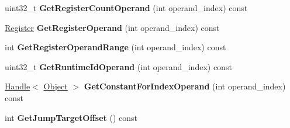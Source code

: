 \begin{DoxyCompactItemize}
\item 
uint32\+\_\+t {\bfseries Get\+Register\+Count\+Operand} (int operand\+\_\+index) const \hypertarget{classv8_1_1internal_1_1interpreter_1_1_bytecode_array_iterator_af5097fc3511c97d6c74ff95febcae001}{}\label{classv8_1_1internal_1_1interpreter_1_1_bytecode_array_iterator_af5097fc3511c97d6c74ff95febcae001}

\item 
\hyperlink{classv8_1_1internal_1_1interpreter_1_1_register}{Register} {\bfseries Get\+Register\+Operand} (int operand\+\_\+index) const \hypertarget{classv8_1_1internal_1_1interpreter_1_1_bytecode_array_iterator_a0deec7570ea13660eac5ed386a8e4236}{}\label{classv8_1_1internal_1_1interpreter_1_1_bytecode_array_iterator_a0deec7570ea13660eac5ed386a8e4236}

\item 
int {\bfseries Get\+Register\+Operand\+Range} (int operand\+\_\+index) const \hypertarget{classv8_1_1internal_1_1interpreter_1_1_bytecode_array_iterator_aa461d65c093c1c438a27b7e59070a0e7}{}\label{classv8_1_1internal_1_1interpreter_1_1_bytecode_array_iterator_aa461d65c093c1c438a27b7e59070a0e7}

\item 
uint32\+\_\+t {\bfseries Get\+Runtime\+Id\+Operand} (int operand\+\_\+index) const \hypertarget{classv8_1_1internal_1_1interpreter_1_1_bytecode_array_iterator_ae3b132e6504ef762511320ecbd2f9ccd}{}\label{classv8_1_1internal_1_1interpreter_1_1_bytecode_array_iterator_ae3b132e6504ef762511320ecbd2f9ccd}

\item 
\hyperlink{classv8_1_1internal_1_1_handle}{Handle}$<$ \hyperlink{classv8_1_1internal_1_1_object}{Object} $>$ {\bfseries Get\+Constant\+For\+Index\+Operand} (int operand\+\_\+index) const \hypertarget{classv8_1_1internal_1_1interpreter_1_1_bytecode_array_iterator_a669738d9a72f0f6a6dce3bfe0379148b}{}\label{classv8_1_1internal_1_1interpreter_1_1_bytecode_array_iterator_a669738d9a72f0f6a6dce3bfe0379148b}

\item 
int {\bfseries Get\+Jump\+Target\+Offset} () const \hypertarget{classv8_1_1internal_1_1interpreter_1_1_bytecode_array_iterator_a26eff1fa95227b23a773da83ce9c3edc}{}\label{classv8_1_1internal_1_1interpreter_1_1_bytecode_array_iterator_a26eff1fa95227b23a773da83ce9c3edc}

\end{DoxyCompactItemize}
